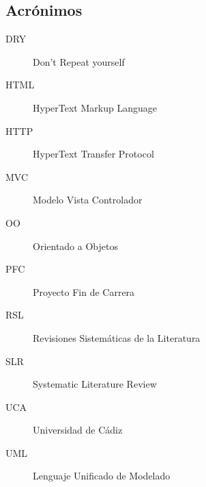\subsection{Acrónimos}
\begin{description}
	\item [DRY]	Don't Repeat yourself
	\item [HTML]	HyperText Markup Language
	\item [HTTP]	HyperText Transfer Protocol
	\item [MVC]	Modelo Vista Controlador
	\item [OO]	Orientado a Objetos
	\item [PFC]	Proyecto Fin de Carrera
	\item [RSL]	Revisiones Sistemáticas de la Literatura
	\item [SLR]	Systematic Literature Review
	\item [UCA]	Universidad de Cádiz
	\item [UML]	Lenguaje Unificado de Modelado
\end{description}

